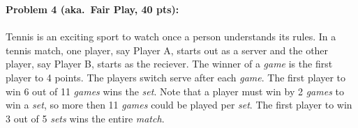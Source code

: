 \documentclass[12pt]{article}
\begin{document}
\vskip0.25in
\newpage
\noindent\textbf{Problem 4 (aka.\ Fair Play, 40 pts):}

\paragraph{} Tennis is an exciting sport to watch once a person understands its rules. In a tennis match, one player, say Player A, starts out as a server and the other player, say Player B, starts as the reciever. The winner of a \emph{game} is the first player to 4 points. The players switch serve after each \emph{game}. The first player to win 6 out of 11 \emph{games} wins the \emph{set}. Note that a player must win by 2 \emph{games} to win a \emph{set}, so more then 11 \emph{games} could be played per \emph{set}. The first player to win 3 out of 5 \emph{sets} wins the entire \emph{match}.
\end{document}

